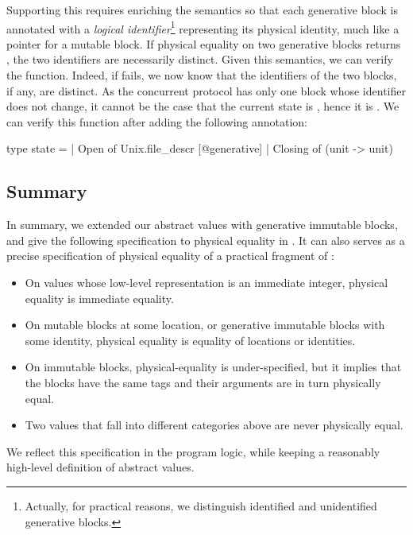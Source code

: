Supporting this requires enriching the \Zoo semantics so that each generative block is annotated with a \emph{logical identifier}\footnote{Actually, for practical reasons, we distinguish identified and unidentified generative blocks.} representing its physical identity, much like a pointer for a mutable block.
If physical equality on two generative blocks returns , the two identifiers are necessarily distinct.
Given this semantics, we can verify the  function.
Indeed, if  fails, we now know that the identifiers of the two blocks, if any, are distinct.
As the concurrent protocol has only one  block whose identifier does not change, it cannot be the case that the current state is , hence it is .
We can verify this function after adding the following annotation:
\begin{ocamlcode}
type state =
  | Open of Unix.file_descr [@generative]
  | Closing of (unit -> unit)
\end{ocamlcode}

\subsection{Summary}

In summary, we extended our abstract values with generative immutable blocks, and give the following specification to physical equality in \ZooLang. It can also serves as a precise specification of physical equality of a practical fragment of \OCaml:

\begin{itemize}
\item On values whose low-level representation is
  an immediate integer, physical equality is immediate equality.
\item On mutable blocks at some location, or generative immutable blocks with some identity, physical equality is equality of locations or identities.
\item On immutable blocks, physical-equality is under-specified, but it implies that the blocks have the same tags and their arguments are in turn physically equal.
\item Two values that fall into different categories above are never physically equal.
\end{itemize}

We reflect this specification in the \Zoo program logic, while keeping a reasonably high-level definition of abstract values.

